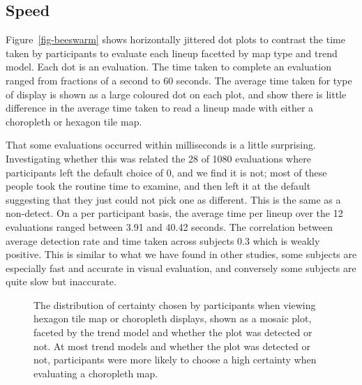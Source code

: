 \documentclass[
doublespace,
  times]{anzsauth}
\begin{document}
\subsection{Speed}\label{speed}

Figure~\ref{fig-beeswarm} shows horizontally jittered dot plots to
contrast the time taken by participants to evaluate each lineup facetted
by map type and trend model. Each dot is an evaluation. The time taken
to complete an evaluation ranged from fractions of a second to 60
seconds. The average time taken for type of display is shown as a large
coloured dot on each plot, and show there is little difference in the
average time taken to read a lineup made with either a choropleth or
hexagon tile map.

That some evaluations occurred within milliseconds is a little
surprising. Investigating whether this was related the 28 of 1080
evaluations where participants left the default choice of 0, and we find
it is not; most of these people took the routine time to examine, and
then left it at the default suggesting that they just could not pick one
as different. This is the same as a non-detect. On a per participant
basis, the average time per lineup over the 12 evaluations ranged
between 3.91 and 40.42 seconds. The correlation between average
detection rate and time taken across subjects 0.3 which is weakly
positive. This is similar to what we have found in other studies, some
subjects are especially fast and accurate in visual evaluation, and
conversely some subjects are quite slow but inaccurate.

\begin{figure}


\caption{\label{fig-certainty}The distribution of certainty chosen by
participants when viewing hexagon tile map or choropleth displays, shown
as a mosaic plot, faceted by the trend model and whether the plot was
detected or not. At most trend models and whether the plot was detected
or not, participants were more likely to choose a high certainty when
evaluating a choropleth map.}

\end{figure}%
\end{document}
